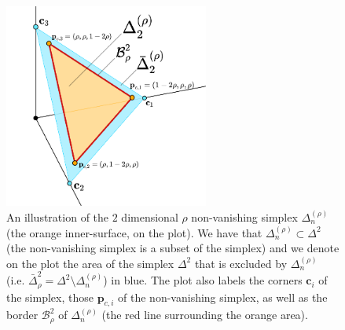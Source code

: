 \begin{figure}[h!]
    \centering
    \includegraphics[width=0.6\textwidth]{figures/2-simplex.png}
    \caption{An illustration of the $2$ dimensional $\rho$ non-vanishing simplex $\Delta^{(\rho)}_n$ (the orange inner-surface, on the plot). We have that $\Delta^{(\rho)}_n \subset \Delta^2$ (the non-vanishing simplex is a subset of the simplex) and we denote on the plot the area of the simplex $\Delta^2$ that is excluded by $\Delta^{(\rho)}_n$ (i.e. $\bar{\Delta}^2_\rho = \Delta^2 \setminus \Delta^{(\rho)}_n$) in blue. The plot also labels the corners $\bm{c}_i$ of the simplex, those $\bm{p}_{c,i}$ of the non-vanishing simplex, as well as the border $\mathcal{B}^2_\rho$ of $\Delta^{(\rho)}_n$ (the red line surrounding the orange area).}
    \label{fig:2simple_nonvanishing}
\end{figure}

